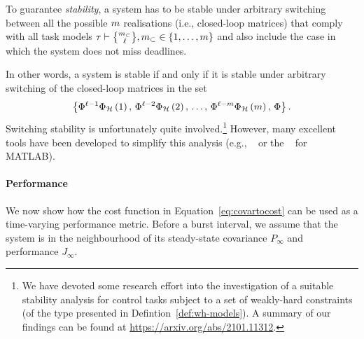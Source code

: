 \begin{definition}%
    To guarantee \emph{\switchingstability{} stability}, a system has to be stable under arbitrary switching between all the possible $m$ realisations (i.e., closed-loop matrices) that comply with all task models $\tau \vdash \genfrac{\{}{\}}{0pt}{}{\nummisses_\subset}{\numtotalanalysed}, \nummisses_\subset \in \{1, \dots,\nummisses\}$ and also include the case in which the system does not miss deadlines.
\end{definition}
In other words, a system is \switchingstability{} stable if and only if it is stable under arbitrary switching of the closed-loop matrices in the set
%
\begin{equation}
    \left\{ \Phi{}^{\ell-1}\Phi{}_{\mathcal{H}}\left( 1 \right),\, \Phi{}^{\ell-2}\Phi{}_{\mathcal{H}}\left( 2 \right),\, \ldots,\, \Phi{}^{\ell-m}\Phi{}_{\mathcal{H}}\left( m \right),\, \Phi{} \right\}.
\end{equation}
%
Switching stability is unfortunately quite involved.\footnote{We have devoted some research effort into the investigation of a suitable stability analysis for control tasks subject to a set of weakly-hard constraints (of the type presented in Defintion~\ref{def:wh-models}). A summary of our findings can be found at \url{https://arxiv.org/abs/2101.11312}.}
However, many excellent tools have been developed to simplify this analysis (e.g., ~\cite{Maggio:2020} or the ~\cite{Jungers:2014} for MATLAB).

\paragraph*{Performance}%

We now show how the cost function in Equation~\eqref{eq:covartocost} can be used as a time-varying performance metric.
Before a burst interval, we assume that the system is in the neighbourhood of its steady-state covariance $P_\infty$ and performance $J_\infty$.

